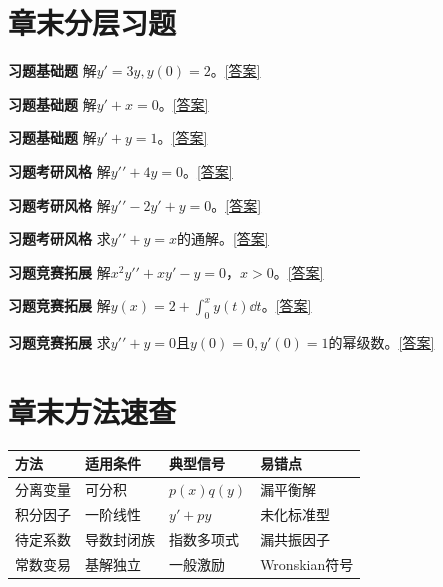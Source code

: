 





\section*{章末分层习题}
\label{q:4:1}\par\noindent\textbf{习题\theexercise\quad 基础题} 解$y\prime=3y,y(0)=2$。\quad\hyperref[a:4:1]{[答案]}\par
{}\label{q:4:2}\par\noindent\textbf{习题\theexercise\quad 基础题} 解$y\prime+x=0$。\quad\hyperref[a:4:2]{[答案]}\par
{}\label{q:4:3}\par\noindent\textbf{习题\theexercise\quad 基础题} 解$y\prime+y=1$。\quad\hyperref[a:4:3]{[答案]}\par
{}\label{q:4:4}\par\noindent\textbf{习题\theexercise\quad 考研风格} 解$y\prime\prime+4y=0$。\quad\hyperref[a:4:4]{[答案]}\par
{}\label{q:4:5}\par\noindent\textbf{习题\theexercise\quad 考研风格} 解$y\prime\prime-2y\prime+y=0$。\quad\hyperref[a:4:5]{[答案]}\par
{}\label{q:4:6}\par\noindent\textbf{习题\theexercise\quad 考研风格} 求$y\prime\prime+y=x$的通解。\quad\hyperref[a:4:6]{[答案]}\par
{}\label{q:4:7}\par\noindent\textbf{习题\theexercise\quad 竞赛拓展} 解$x^2y\prime\prime+xy\prime-y=0$，$x>0$。\quad\hyperref[a:4:7]{[答案]}\par
{}\label{q:4:8}\par\noindent\textbf{习题\theexercise\quad 竞赛拓展} 解$y(x)=2+\int_0^xy(t)\dd t$。\quad\hyperref[a:4:8]{[答案]}\par
{}\label{q:4:9}\par\noindent\textbf{习题\theexercise\quad 竞赛拓展} 求$y\prime\prime+y=0$且$y(0)=0,y\prime(0)=1$的幂级数。\quad\hyperref[a:4:9]{[答案]}\par
\section*{章末方法速查}
\par\noindent\begin{tabularx}{\textwidth}{p{23mm}XXX}\toprule 方法&适用条件&典型信号&易错点\\\midrule
分离变量&可分积&$p(x)q(y)$&漏平衡解\\积分因子&一阶线性&$y\prime+py$&未化标准型\\待定系数&导数封闭族&指数多项式&漏共振因子\\常数变易&基解独立&一般激励&Wronskian符号\\
\bottomrule\end{tabularx}
